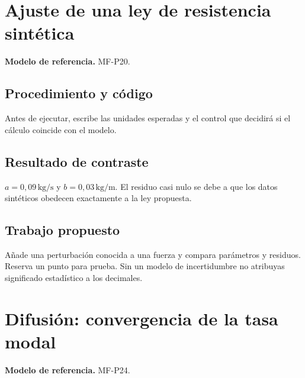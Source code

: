 \studiumchaptercheck

\chapter{Ajuste de una ley de resistencia sintética}


\textbf{Modelo de referencia.} MF-P20.\par

\section{Procedimiento y código}

Antes de ejecutar, escribe las unidades esperadas y el control que decidirá si el cálculo coincide con el modelo.



\section{Resultado de contraste}

$a=0{,}09\,\mathrm{kg/s}$ y $b=0{,}03\,\mathrm{kg/m}$. El residuo casi nulo se debe a que los datos sintéticos obedecen exactamente a la ley propuesta.

\section{Trabajo propuesto}

Añade una perturbación conocida a una fuerza y compara parámetros y residuos. Reserva un punto para prueba. Sin un modelo de incertidumbre no atribuyas significado estadístico a los decimales.

\studiumchaptercheck

\chapter{Difusión: convergencia de la tasa modal}


\textbf{Modelo de referencia.} MF-P24.\par

